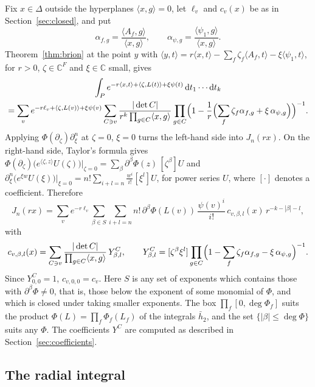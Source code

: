 \documentclass[11pt]{article}
\theoremstyle{remark}
\newcommand{\C}{\mathbb{C}}
\newcommand{\scal}[2]{\langle #1, #2\rangle}
\newcommand{\dd}{\mathrm{d}}
\begin{document}
Fix $x \in \Delta$ outside the hyperplanes $\scal{x}{g} = 0$, let $\ell_v$
and $c_v(x)$ be as in Section~\ref{sec:closed}, and put
\[
  \alpha_{f,g} = \frac{\scal{A_f}{g}}{\scal{x}{g}}, \qquad
  \alpha_{\psi,g} = \frac{\scal{\psi_1}{g}}{\scal{x}{g}}.
\]
Theorem~\ref{thm:brion} at the point $y$ with $\scal{y}{t} = r\scal{x}{t} -
\sum_f \zeta_f \scal{A_f}{t} - \xi \scal{\psi_1}{t}$, for $r > 0$, $\zeta
\in \C^F$ and $\xi \in \C$ small, gives
\begin{multline*}
  \int_P e^{-r\scal{x}{t} + \scal{\zeta}{L(t)} + \xi \psi(t)} \,
  \dd t_1 \cdots \dd t_k \\
  = \sum_v e^{-r\ell_v + \scal{\zeta}{L(v)} + \xi\psi(v)}
    \sum_{C \ni v} \frac{|\det C|}{r^k \prod_{g \in C} \scal{x}{g}}
    \prod_{g \in C} \Bigl( 1 - \frac{1}{r} \Bigl( \sum_f \zeta_f
    \alpha_{f,g} + \xi \, \alpha_{\psi,g} \Bigr) \Bigr)^{-1}.
\end{multline*}
Applying $\Phi(\partial_\zeta) \partial_\xi^n$ at $\zeta = 0$, $\xi = 0$
turns the left-hand side into $J_n(rx)$. On the right-hand side, Taylor's
formula gives $\Phi(\partial_\zeta)\bigl(e^{\scal{\zeta}{z}} U(\zeta)\bigr)
|_{\zeta = 0} = \sum_\beta \partial^\beta \Phi(z) \, [\zeta^\beta] U$ and
$\partial_\xi^n \bigl(e^{\xi w} U(\xi)\bigr)|_{\xi = 0} = n! \sum_{i + l =
n} \frac{w^i}{i!} [\xi^l] U$, for power series $U$, where $[\cdot]$ denotes
a coefficient. Therefore
\begin{equation}\label{eq:J}
  J_n(rx) = \sum_v e^{-r\ell_v} \sum_{\beta \in S}
    \sum_{i + l = n} n! \, \partial^\beta \Phi(L(v)) \,
    \frac{\psi(v)^i}{i!} \, c_{v,\beta,l}(x) \, r^{-k - |\beta| - l},
\end{equation}
with
\[
  c_{v,\beta,l}(x) = \sum_{C \ni v} \frac{|\det C|}{\prod_{g \in C}
    \scal{x}{g}} \, Y^C_{\beta,l}, \qquad
  Y^C_{\beta,l} = [\zeta^\beta \xi^l] \prod_{g \in C} \Bigl( 1 -
    \sum_f \zeta_f \alpha_{f,g} - \xi \, \alpha_{\psi,g} \Bigr)^{-1}.
\]
Since $Y^C_{0,0} = 1$, $c_{v,0,0} = c_v$. Here $S$ is any set of exponents
which contains those with $\partial^\beta \Phi \neq 0$, that is, those below
the exponent of some monomial of $\Phi$, and which is closed under taking
smaller exponents. The box $\prod_f [0, \deg \Phi_f]$ suits the product
$\Phi(L) = \prod_f \Phi_f(L_f)$ of the integrals $\bar h_2$, and the set
$\{|\beta| \leq \deg \Phi\}$ suits any $\Phi$. The coefficients $Y^C$ are
computed as described in Section~\ref{sec:coefficients}.

\subsection{The radial integral}
\end{document}
